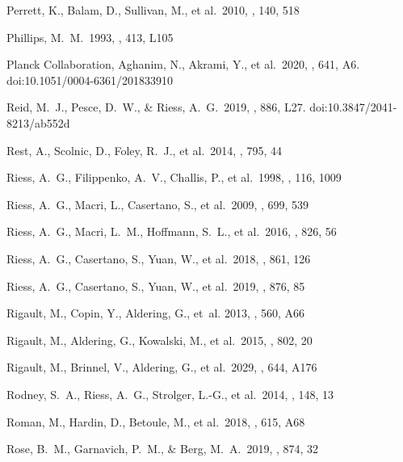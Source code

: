 \documentclass[]{aa}
\begin{document}
\begin{thebibliography}{}
 Perrett, K., Balam, D., Sullivan,
M., et al.\ 2010, \aj, 140, 518

 Phillips, M.~M.\ 1993, \apjl, 413, L105

 Planck
Collaboration, Aghanim, N., Akrami, Y., et al.\ 2020, \aap, 641, A6.
doi:10.1051/0004-6361/201833910



 Reid, M.~J., Pesce, D.~W., \& Riess,
A.~G.\ 2019, \apjl, 886, L27. doi:10.3847/2041-8213/ab552d

 Rest, A., Scolnic, D., Foley, R.~J., et
al.\ 2014, \apj, 795, 44

 Riess, A.~G., Filippenko, A.~V.,
Challis, P., et al.\ 1998, \aj, 116, 1009

 Riess, A.~G., Macri, L., Casertano, S.,
et al.\ 2009, \apj, 699, 539

 Riess, A.~G., Macri, L.~M., Hoffmann,
S.~L., et al.\ 2016, \apj, 826, 56

 Riess, A.~G., Casertano, S., Yuan, W.,
et al.\ 2018, \apj, 861, 126

 Riess, A.~G., Casertano, S., Yuan, W.,
et al.\ 2019, \apj, 876, 85

 Rigault, M., Copin, Y.,
Aldering, G., {et~al.} 2013, \aap, 560, A66

 Rigault, M., Aldering, G., Kowalski,
M., et al.\ 2015, \apj, 802, 20

 Rigault, M., Brinnel, V., Aldering,
G., et al.\ 2029, \aap, 644, A176

 Rodney, S.~A., Riess, A.~G., Strolger,
L.-G., et al.\ 2014, \aj, 148, 13 
  
 Roman, M., Hardin, D., Betoule, M., et
al.\ 2018, \aap, 615, A68

 Rose, B.~M., Garnavich, P.~M., \& Berg,
M.~A.\ 2019, \apj, 874, 32


\end{thebibliography}
\end{document}
